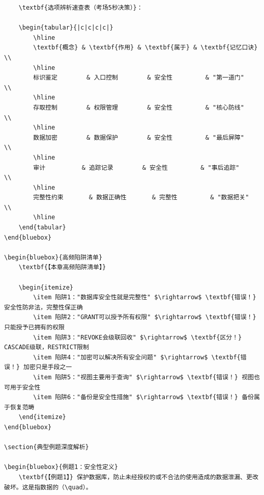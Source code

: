 \documentclass[12pt, a4paper]{article}
\newenvironment{bluebox}[1]{%
  \begin{trivlist}
  \item[\hskip\labelsep \textbf{#1}]
  \setlength{\parskip}{0.5ex}
  \setlength{\itemsep}{0.5ex}
}{%
  \end{trivlist}
}
\begin{document}
\begin{bluebox}{用户管理}
\begin{enumerate}[leftmargin=*, label=\textbf{\arabic*.}]
\begin{verbatim}
	\textbf{选项辨析速查表（考场5秒决策）}：

	\begin{tabular}{|c|c|c|c|}
		\hline
		\textbf{概念} & \textbf{作用} & \textbf{属于} & \textbf{记忆口诀} \\
		\hline
		标识鉴定        & 入口控制        & 安全性         & "第一道门"        \\
		\hline
		存取控制        & 权限管理        & 安全性         & "核心防线"        \\
		\hline
		数据加密        & 数据保护        & 安全性         & "最后屏障"        \\
		\hline
		审计          & 追踪记录        & 安全性         & "事后追踪"        \\
		\hline
		完整性约束       & 数据正确性       & 完整性         & "数据把关"        \\
		\hline
	\end{tabular}
\end{bluebox}

\begin{bluebox}{高频陷阱清单}
	\textbf{【本章高频陷阱清单】}

	\begin{itemize}
		\item 陷阱1："数据库安全性就是完整性" $\rightarrow$ \textbf{错误！} 安全性防非法，完整性保正确
		\item 陷阱2："GRANT可以授予所有权限" $\rightarrow$ \textbf{错误！} 只能授予已拥有的权限
		\item 陷阱3："REVOKE会级联回收" $\rightarrow$ \textbf{区分！} CASCADE级联，RESTRICT限制
		\item 陷阱4："加密可以解决所有安全问题" $\rightarrow$ \textbf{错误！} 加密只是手段之一
		\item 陷阱5："视图主要用于查询" $\rightarrow$ \textbf{错误！} 视图也可用于安全性
		\item 陷阱6："备份是安全性措施" $\rightarrow$ \textbf{错误！} 备份属于恢复范畴
	\end{itemize}
\end{bluebox}

\section{典型例题深度解析}

\begin{bluebox}{例题1：安全性定义}
	\textbf{【例题1】} 保护数据库，防止未经授权的或不合法的使用造成的数据泄漏、更改破坏。这是指数据的（\quad）。


\end{verbatim}
\end{enumerate}
\end{bluebox}
\end{document}
